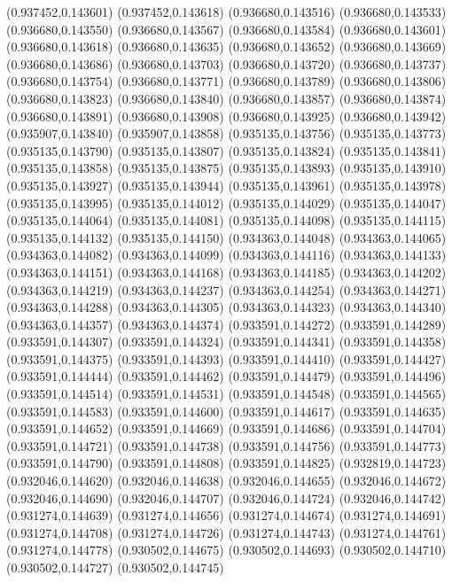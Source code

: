 (0.937452,0.143601)
(0.937452,0.143618)
(0.936680,0.143516)
(0.936680,0.143533)
(0.936680,0.143550)
(0.936680,0.143567)
(0.936680,0.143584)
(0.936680,0.143601)
(0.936680,0.143618)
(0.936680,0.143635)
(0.936680,0.143652)
(0.936680,0.143669)
(0.936680,0.143686)
(0.936680,0.143703)
(0.936680,0.143720)
(0.936680,0.143737)
(0.936680,0.143754)
(0.936680,0.143771)
(0.936680,0.143789)
(0.936680,0.143806)
(0.936680,0.143823)
(0.936680,0.143840)
(0.936680,0.143857)
(0.936680,0.143874)
(0.936680,0.143891)
(0.936680,0.143908)
(0.936680,0.143925)
(0.936680,0.143942)
(0.935907,0.143840)
(0.935907,0.143858)
(0.935135,0.143756)
(0.935135,0.143773)
(0.935135,0.143790)
(0.935135,0.143807)
(0.935135,0.143824)
(0.935135,0.143841)
(0.935135,0.143858)
(0.935135,0.143875)
(0.935135,0.143893)
(0.935135,0.143910)
(0.935135,0.143927)
(0.935135,0.143944)
(0.935135,0.143961)
(0.935135,0.143978)
(0.935135,0.143995)
(0.935135,0.144012)
(0.935135,0.144029)
(0.935135,0.144047)
(0.935135,0.144064)
(0.935135,0.144081)
(0.935135,0.144098)
(0.935135,0.144115)
(0.935135,0.144132)
(0.935135,0.144150)
(0.934363,0.144048)
(0.934363,0.144065)
(0.934363,0.144082)
(0.934363,0.144099)
(0.934363,0.144116)
(0.934363,0.144133)
(0.934363,0.144151)
(0.934363,0.144168)
(0.934363,0.144185)
(0.934363,0.144202)
(0.934363,0.144219)
(0.934363,0.144237)
(0.934363,0.144254)
(0.934363,0.144271)
(0.934363,0.144288)
(0.934363,0.144305)
(0.934363,0.144323)
(0.934363,0.144340)
(0.934363,0.144357)
(0.934363,0.144374)
(0.933591,0.144272)
(0.933591,0.144289)
(0.933591,0.144307)
(0.933591,0.144324)
(0.933591,0.144341)
(0.933591,0.144358)
(0.933591,0.144375)
(0.933591,0.144393)
(0.933591,0.144410)
(0.933591,0.144427)
(0.933591,0.144444)
(0.933591,0.144462)
(0.933591,0.144479)
(0.933591,0.144496)
(0.933591,0.144514)
(0.933591,0.144531)
(0.933591,0.144548)
(0.933591,0.144565)
(0.933591,0.144583)
(0.933591,0.144600)
(0.933591,0.144617)
(0.933591,0.144635)
(0.933591,0.144652)
(0.933591,0.144669)
(0.933591,0.144686)
(0.933591,0.144704)
(0.933591,0.144721)
(0.933591,0.144738)
(0.933591,0.144756)
(0.933591,0.144773)
(0.933591,0.144790)
(0.933591,0.144808)
(0.933591,0.144825)
(0.932819,0.144723)
(0.932046,0.144620)
(0.932046,0.144638)
(0.932046,0.144655)
(0.932046,0.144672)
(0.932046,0.144690)
(0.932046,0.144707)
(0.932046,0.144724)
(0.932046,0.144742)
(0.931274,0.144639)
(0.931274,0.144656)
(0.931274,0.144674)
(0.931274,0.144691)
(0.931274,0.144708)
(0.931274,0.144726)
(0.931274,0.144743)
(0.931274,0.144761)
(0.931274,0.144778)
(0.930502,0.144675)
(0.930502,0.144693)
(0.930502,0.144710)
(0.930502,0.144727)
(0.930502,0.144745)
